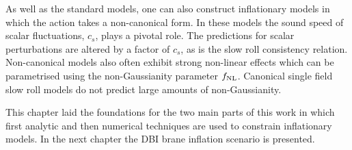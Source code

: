 As well as the standard models, one can also construct inflationary models in which the action
takes a non-canonical form. In these models the sound speed of scalar fluctuations, $c_s$, plays a
pivotal role. The predictions for scalar perturbations are altered by a factor of $c_s$, as is the
slow roll consistency relation. Non-canonical models also often exhibit strong non-linear effects
which can be parametrised using the non-Gaussianity parameter $f_{\mathrm{NL}}$. Canonical single field slow
roll models do not predict large amounts of non-Gaussianity. 

This chapter laid the foundations for the two main parts of this work in which first
analytic
and then numerical techniques are used to constrain inflationary models. In the next chapter the
DBI brane inflation scenario is presented. 

